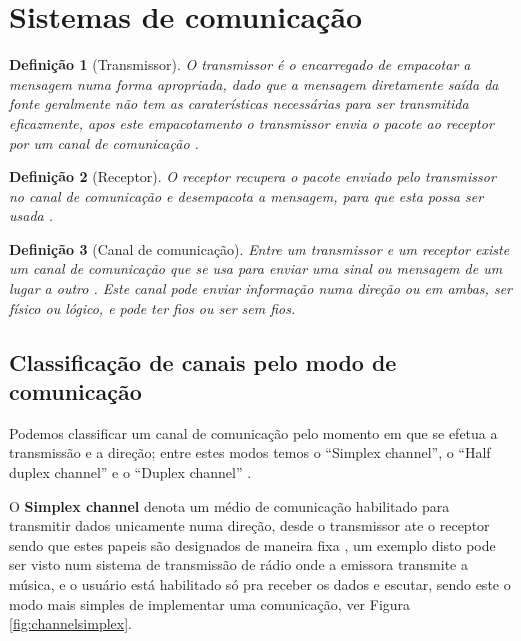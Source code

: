 \documentclass[a4paper,10pt]{article}
\newtheorem{mydef}{Definição}
\begin{document}
\section{Sistemas de comunicação}
\begin{mydef}[Transmissor]
O transmissor é o encarregado de empacotar a mensagem numa forma apropriada, 
dado que a mensagem diretamente saída da fonte
geralmente não tem as caraterísticas necessárias para ser transmitida eficazmente,
apos este empacotamento o transmissor envia o pacote ao receptor por um canal de comunicação \cite[pp. 10]{ibarra1999principios} \cite[pp. 479]{sawaya2002dicionario}.
\end{mydef}
\begin{mydef}[Receptor]
O receptor recupera o pacote enviado pelo transmissor no canal de comunicação e desempacota a mensagem,
para que esta possa ser usada \cite[pp. 10]{ibarra1999principios} \cite[pp. 389]{sawaya2002dicionario}.
\end{mydef}
\begin{mydef}[Canal de comunicação]
Entre um transmissor e um receptor existe um canal de comunicação que se usa 
para enviar uma sinal ou mensagem de um lugar a outro \cite[pp. 10]{jairo2007analisis} \cite[pp. 364]{lechtaler1999teleinformatica} \cite[pp. 10]{ibarra1999principios}.
Este canal pode enviar informação numa direção ou em ambas, 
ser físico ou lógico, e pode ter fios ou ser sem fios.
\end{mydef}

\subsection{Classificação de canais pelo modo de comunicação}
Podemos classificar um canal de comunicação  
pelo momento em que se efetua a transmissão e a direção; 
entre estes modos temos o ``Simplex channel'', o ``Half duplex channel'' e o 
``Duplex channel'' \cite[pp.60 ]{hura2001data}\cite[pp. 5]{shinde2009computer}.

O \textbf{Simplex channel} denota um médio de comunicação habilitado 
para transmitir dados unicamente numa direção, desde o transmissor ate o receptor 
sendo que estes papeis são designados de maneira fixa 
\cite[pp. 5]{shinde2009computer} \cite[pp. 430]{sawaya2002dicionario} \cite[pp.60 ]{hura2001data}, 
um exemplo disto pode ser visto num sistema de transmissão de rádio onde a emissora 
transmite a música, e o usuário está habilitado só pra receber os dados e escutar, 
sendo este o modo mais simples de implementar uma comunicação,
ver Figura \ref{fig:channelsimplex}. 
\end{document}
